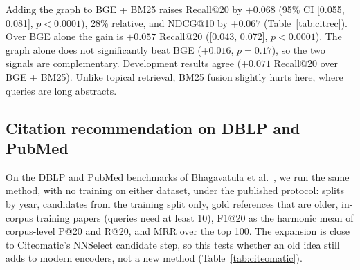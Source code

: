 \documentclass[conference]{IEEEtran}
\begin{document}
Adding the graph to BGE + BM25 raises Recall@20 by $+0.068$ (95\% CI [0.055, 0.081], $p < 0.0001$), 28\% relative, and NDCG@10 by $+0.067$ (Table~\ref{tab:citrec}). Over BGE alone the gain is $+0.057$ Recall@20 ([0.043, 0.072], $p < 0.0001$). The graph alone does not significantly beat BGE ($+0.016$, $p = 0.17$), so the two signals are complementary. Development results agree ($+0.071$ Recall@20 over BGE + BM25). Unlike topical retrieval, BM25 fusion slightly hurts here, where queries are long abstracts.

\subsection{Citation recommendation on DBLP and PubMed}
\label{sec:citeomatic}

On the DBLP and PubMed benchmarks of Bhagavatula et al.~\cite{bhagavatula2018content}, we run the same method, with no training on either dataset, under the published protocol: splits by year, candidates from the training split only, gold references that are older, in-corpus training papers (queries need at least 10), F1@20 as the harmonic mean of corpus-level P@20 and R@20, and MRR over the top 100. The expansion is close to Citeomatic's NNSelect candidate step, so this tests whether an old idea still adds to modern encoders, not a new method (Table~\ref{tab:citeomatic}).

\begin{table}[t]
\centering
\caption{DBLP and PubMed test splits (F1@20 / MRR); bold: best of our methods}
\label{tab:citeomatic}
\end{table}
\end{document}
